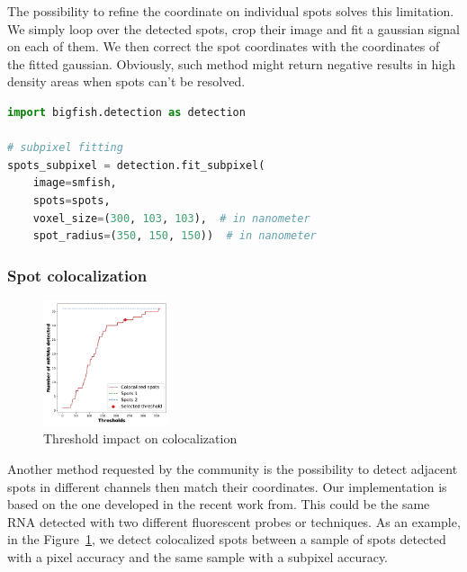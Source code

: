 The possibility to refine the coordinate on individual spots solves this limitation.
We simply loop over the detected spots, crop their image and fit a gaussian signal on each of them.
We then correct the spot coordinates with the coordinates of the fitted gaussian.
Obviously, such method might return negative results in high density areas when spots can't be resolved.\\

\begin{minipage}{0.9\textwidth}
\begin{lstlisting}[language=Python]
import bigfish.detection as detection

# subpixel fitting
spots_subpixel = detection.fit_subpixel(
    image=smfish,
    spots=spots,
    voxel_size=(300, 103, 103),  # in nanometer
    spot_radius=(350, 150, 150))  # in nanometer
\end{lstlisting}
\end{minipage}

\subsubsection{Spot colocalization}

\begin{figure}
	\begin{center}
		\includegraphics[width=0.33\textwidth]{figures/chapter2/colocalization_elbow}
	\caption{Threshold impact on colocalization}
	\label{fig:elbow_colocalization}
	\end{center}
\end{figure}

Another method requested by the community is the possibility to detect adjacent spots in different channels then match their coordinates.
Our implementation is based on the one developed in the recent work from\cite{CORNES_2022}.
This could be the same \ac{RNA} detected with two different fluorescent probes or techniques.
As an example, in the Figure~\ref{fig:elbow_colocalization}, we detect colocalized spots between a sample of spots detected with a pixel accuracy and the same sample with a subpixel accuracy.

